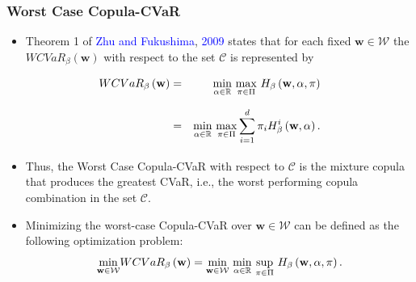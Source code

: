 \documentclass[pdf,9pt,xcolor=dvipsnames,hide notes]{beamer}
\begin{document}
\begin{frame}[label=frame3d]
	\frametitle{Worst Case Copula-CVaR}
	
	\begin{itemize}
		\justifying
		
		\item 	Theorem 1 of \textcolor{blue}{Zhu and Fukushima}, \textcolor{blue}{2009} states that for each
		fixed $\mathbf{w}\in \mathcal{W}$ the $WCVaR_{\beta }\left( \mathbf{w}%
		\right) $ with respect to the set $\mathcal{C}$ is represented by
		
	\end{itemize}
		\begin{eqnarray}
		WCVaR_{\beta }\left( \mathbf{w}\right) &=&\underset{}{\underset{\alpha \in
				\mathbb{R}
			}{\min }~\underset{\pi \in \Pi }{\max }}~H_{\beta }\left( \mathbf{w},\alpha
		,\pi \right)  \notag \\
		&=&\underset{}{\underset{\alpha \in
				\mathbb{R}
			}{\min }~\underset{\pi \in \Pi }{\max }}\sum_{i=1}^{d}\pi _{i}H_{\beta
		}^{i}\left( \mathbf{w},\alpha \right) .  \label{31}
		\end{eqnarray}%
		
		\begin{itemize}
			
			\item Thus, the Worst Case Copula-CVaR with respect to $\mathcal{C}$ is the
			mixture copula that produces the greatest CVaR, i.e., the worst performing
			copula combination in the set $\mathcal{C}$.
			
			\vspace{0.3cm}
			
			\item Minimizing the
			worst-case Copula-CVaR over $\mathbf{w}\in \mathcal{W}$ can be defined as
			the following optimization problem:%
			\begin{equation}
			\underset{\mathbf{w}\in \mathcal{W}}{\min }WCVaR_{\beta }\left( \mathbf{w}%
			\right) =\underset{}{\underset{\mathbf{w}\in \mathcal{W}}{\min }~\underset{%
					\alpha \in
					\mathbb{R}
				}{\min }~\underset{\pi \in \Pi }{\sup }}~H_{\beta }\left( \mathbf{w},\alpha
			,\pi \right) .  \label{32}
			\end{equation}%
			
					
	\end{itemize}
	

\end{frame}
\end{document}
